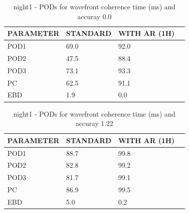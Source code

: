 \begin{table}[p!]
\begin{center}
\begin{tabular}{|l|l|l|l|}
\hline
\multicolumn{1}{|c|}{\cellcolor[HTML]{C0C0C0}\textbf{PARAMETER}} & \multicolumn{1}{c|}{\cellcolor[HTML]{C0C0C0}\textbf{STANDARD}} & \multicolumn{1}{c|}{\cellcolor[HTML]{C0C0C0}\textbf{WITH AR (1H)}} \\
\hline
\cellcolor[HTML]{C0C0C0}POD1  & 69.0                                & 92.0         \\
\cellcolor[HTML]{C0C0C0}POD2  & 47.5                                & 88.4         \\
\cellcolor[HTML]{C0C0C0}POD3  & 73.1                                & 93.3         \\
\cellcolor[HTML]{C0C0C0}PC    & 62.5                                  & 91.1           \\
\cellcolor[HTML]{C0C0C0}EBD   & 1.9                                 & 0.0          \\
\hline
\end{tabular}
\caption{night1 - PODs for wavefront coherence time (ms) and accuray 0.0}
\label{tab:podtau0.0:night1}
\end{center}
\end{table}
\begin{table}[p!]
\begin{center}
\begin{tabular}{|l|l|l|l|}
\hline
\multicolumn{1}{|c|}{\cellcolor[HTML]{C0C0C0}\textbf{PARAMETER}} & \multicolumn{1}{c|}{\cellcolor[HTML]{C0C0C0}\textbf{STANDARD}} & \multicolumn{1}{c|}{\cellcolor[HTML]{C0C0C0}\textbf{WITH AR (1H)}} \\
\hline
\cellcolor[HTML]{C0C0C0}POD1  & 88.7                                & 99.8         \\
\cellcolor[HTML]{C0C0C0}POD2  & 82.8                                & 99.2         \\
\cellcolor[HTML]{C0C0C0}POD3  & 81.7                                & 99.1         \\
\cellcolor[HTML]{C0C0C0}PC    & 86.9                                  & 99.5           \\
\cellcolor[HTML]{C0C0C0}EBD   & 5.0                                 & 0.2          \\
\hline
\end{tabular}
\caption{night1 - PODs for wavefront coherence time (ms) and accuray 1.22}
\label{tab:podtau1.22:night1}
\end{center}
\end{table}
